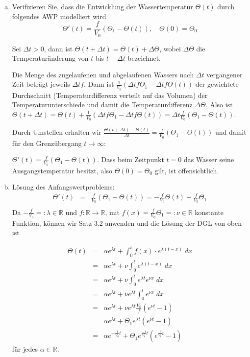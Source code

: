 \documentclass[11pt,a4paper,ngerman]{article}
\begin{document}
\begin{enumerate}[a)]
\item Verifizieren Sie, dass die Entwicklung der Wassertemperatur $\Theta(t)$ durch folgendes AWP modelliert wird
$$ \Theta'(t) = \frac{f}{V_0}(\Theta_1 - \Theta(t)), \quad \Theta(0) = \Theta_0$$ 

Sei $\Delta t > 0$, dann ist $\Theta(t + \Delta t) = \Theta(t) + \Delta \Theta$, wobei $\Delta \Theta$ die Temperaturänderung von $t$ bis $t + \Delta t$ bezeichnet.

Die Menge des zugelaufenen und abgelaufenen Wassers nach $\Delta t$ vergangener Zeit beträgt jeweils $\Delta t f$. Dann ist $\frac{1}{V_0}(\Delta t f \Theta_1 - \Delta t f \Theta(t))$ der gewichtete Durchschnitt (Temperaturdifferenz verteilt auf das Volumen) der Temperaturunterschiede und damit die Temperaturdifferenz $\Delta \Theta$. Also ist $\Theta(t + \Delta t) = \Theta(t) + \frac{1}{V_0}(\Delta t f \Theta_1 - \Delta t f \Theta(t)) = \Delta t \frac{f}{V_0} (\Theta_1 - \Theta(t))$.

Durch Umstellen erhalten wir $\frac{\Theta(t + \Delta t) - \Theta(t)}{\Delta t} = \frac{f}{V_0} (\Theta_1 - \Theta(t))$ und damit für den Grenzübergang $t \to \infty$:

$\Theta'(t) = \frac{f}{V_0} (\Theta_1 - \Theta(t))$. Dass beim Zeitpunkt $t= 0$ das Wasser seine Ausgangstemperatur besitzt, also $\Theta(0) = \Theta_0$ gilt, ist offensichtlich.

\item Lösung des Anfangswertproblems:
\begin{eqnarray*}
\Theta'(t) &=& \frac{f}{V_0} (\Theta_1 - \Theta(t)) = -\frac{f}{V_0} \Theta(t) + \frac{f}{V_0}\Theta_1 \\ 
\end{eqnarray*}
Da $-\frac{f}{V_0} =: \lambda \in \mathbb{R}$ und $f : \mathbb{R} \to \mathbb{R}$, mit $f(x)= \frac{f}{V_0}\Theta_1 =: \nu \in \mathbb{R}$ konstante Funktion, können wir Satz 3.2 anwenden und die Lösung der DGL von oben ist

\begin{eqnarray*}
\Theta(t) &=& \alpha e^{\lambda t} + \int_0^t f(x) \cdot e^{\lambda(t-x)} \; dx \\
&=& \alpha e^{\lambda t} + \nu \int_0^t e^{\lambda(t-x)} \; dx \\
&=& \alpha e^{\lambda t} + \nu \int_0^t  e^{\lambda t} e^{\nu x} \; dx \\
&=& \alpha e^{\lambda t} + \nu e^{\lambda t} \int_0^t  e^{\nu x} \; dx \\
&=& \alpha e^{\lambda t} + \nu e^{\lambda t} \frac{V_0}{f} (e^{\nu t} - 1) \\
&=& \alpha e^{\lambda t} + \Theta_1  e^{\lambda t} (e^{\nu t} - 1) \\
&=& \alpha e^{-\frac{f}{V_0} t} + \Theta_1  e^{\frac{-f}{V_0} t} (e^{\frac{f}{V_0} t} - 1) 
\end{eqnarray*}
für jedes $\alpha \in \mathbb{R}$.


\end{enumerate}
\end{document}
